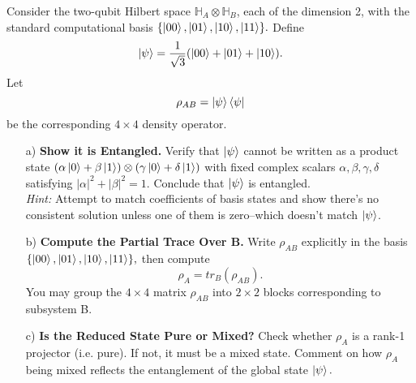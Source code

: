 \documentclass{article}
\renewcommand{\H}{\mathbb{H}}
\begin{document}
\begin{question}
    Consider the two-qubit Hilbert space $\H_A \otimes \H_B$, each of the dimension 2, with the standard computational basis $\{\ket{00},\ket{01},\ket{10},\ket{11} \}.$ Define $$\ket{\psi}=\frac{1}{\sqrt{3}}(\ket{00}+\ket{01}+\ket{10}).$$ Let $$\rho_{AB}=\ket{\psi}\bra{\psi}$$ be the corresponding $4 \times 4$ density operator.
    \begin{enumerate}
        \item[a)]\textbf{Show it is Entangled.} Verify that $\ket{\psi}$ cannot be written as a product state $(\alpha\ket{0}+\beta\ket{1})\otimes(\gamma\ket{0}+\delta\ket{1})$ with fixed complex scalars $\alpha,\beta,\gamma,\delta$ satisfying $|\alpha|^2+|\beta|^2=1.$ Conclude that $\ket{\psi}$ is entangled.\\
        \textit{Hint:} Attempt to match coefficients of basis states and show there's no consistent solution unless one of them is zero--which doesn't match $\ket{\psi}$.
        \item[b)]\textbf{Compute the Partial Trace Over B.} Write $\rho_{AB}$ explicitly in the basis $\{\ket{00}, \ket{01}, \ket{10}, \ket{11} \},$ then compute $$\rho_A=tr_B(\rho_{AB}).$$ You may group the $4 \times 4$ matrix $\rho_{AB}$ into $2 \times 2$ blocks corresponding to subsystem B.
        \item[c)] \textbf{Is the Reduced State Pure or Mixed?} Check whether $\rho_A$ is a rank-1 projector (i.e. pure). If not, it must be a mixed state. Comment on how $\rho_A$ being mixed reflects the entanglement of the global state $\ket{\psi}.$
    \end{enumerate}
\end{question}
\end{document}
